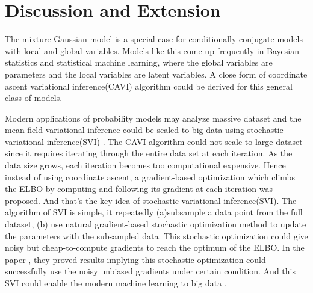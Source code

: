 \documentclass[letterpaper]{article}
\begin{document}
\section{Discussion and Extension}

The mixture Gaussian model is a special case for conditionally conjugate models with local and global variables. Models like this come up frequently in Bayesian statistics and statistical machine learning, where the global variables are parameters and the local variables are latent variables. A close form of coordinate ascent variational inference(CAVI) algorithm could be derived for this general class of models. 

Modern applications of probability models may analyze massive dataset and the mean-field variational inference could be scaled to big data using stochastic variational inference(SVI) \citep{hoffman2013stochastic}. The CAVI algorithm could not scale to large dataset since it requires iterating through the entire data set at each iteration. As the data size grows, each iteration becomes too computational expensive. Hence instead of using coordinate ascent, a gradient-based optimization which climbs the ELBO by computing and following its gradient at each iteration was proposed. And that's the key idea of stochastic variational inference(SVI). The algorithm of SVI is simple, it repeatedly (a)subsample a data point from the full dataset, (b) use natural gradient-based stochastic optimization method to update the parameters with the subsampled data. This stochastic optimization could give noisy but cheap-to-compute gradients to reach the optimum of the ELBO. In the paper \citep{robbins1951textordfemininea}, they proved results implying this stochastic optimization could successfully use the noisy unbiased gradients under certain condition. And this SVI could enable the modern machine learning to big data \citep{bottou2004large}. 



\end{document}
